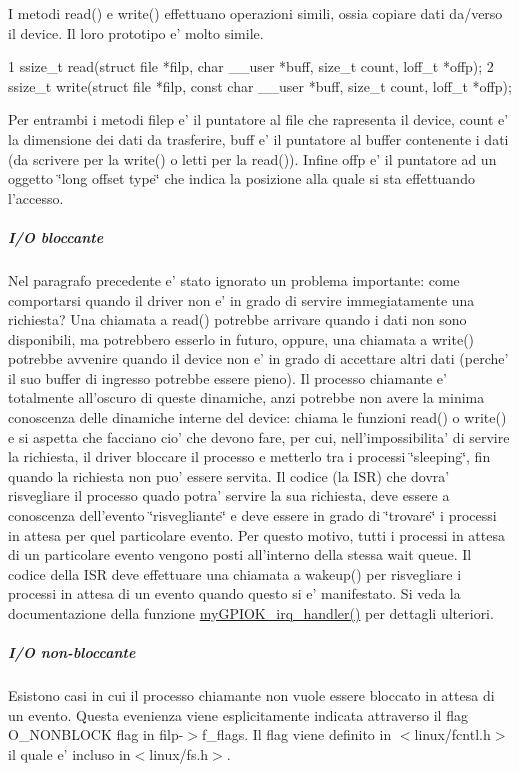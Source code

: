 I metodi read() e write() effettuano operazioni simili, ossia copiare dati da/verso il device. Il loro prototipo e' molto simile. 
\begin{DoxyCode}
1 ssize\_t read(struct file *filp, char \_\_user *buff, size\_t count, loff\_t *offp);
2 ssize\_t write(struct file *filp, const char \_\_user *buff, size\_t count, loff\_t *offp);
\end{DoxyCode}
 Per entrambi i metodi filep e' il puntatore al file che rapresenta il device, count e' la dimensione dei dati da trasferire, buff e' il puntatore al buffer contenente i dati (da scrivere per la write() o letti per la read()). Infine offp e' il puntatore ad un oggetto \char`\"{}long offset type\char`\"{} che indica la posizione alla quale si sta effettuando l'accesso.

\subparagraph*{I/\+O bloccante}

Nel paragrafo precedente e' stato ignorato un problema importante\+: come comportarsi quando il driver non e' in grado di servire immegiatamente una richiesta? Una chiamata a read() potrebbe arrivare quando i dati non sono disponibili, ma potrebbero esserlo in futuro, oppure, una chiamata a write() potrebbe avvenire quando il device non e' in grado di accettare altri dati (perche' il suo buffer di ingresso potrebbe essere pieno). Il processo chiamante e' totalmente all'oscuro di queste dinamiche, anzi potrebbe non avere la minima conoscenza delle dinamiche interne del device\+: chiama le funzioni read() o write() e si aspetta che facciano cio' che devono fare, per cui, nell'impossibilita' di servire la richiesta, il driver bloccare il processo e metterlo tra i processi \char`\"{}sleeping\char`\"{}, fin quando la richiesta non puo' essere servita. Il codice (la I\+S\+R) che dovra' risvegliare il processo quado potra' servire la sua richiesta, deve essere a conoscenza dell'evento \char`\"{}risvegliante\char`\"{} e deve essere in grado di \char`\"{}trovare\char`\"{} i processi in attesa per quel particolare evento. Per questo motivo, tutti i processi in attesa di un particolare evento vengono posti all'interno della stessa wait queue. Il codice della I\+S\+R deve effettuare una chiamata a wakeup() per risvegliare i processi in attesa di un evento quando questo si e' manifestato. Si veda la documentazione della funzione \hyperlink{group___linux-_driver_ga2fc230a12a97aa63e43b2dc4aec73511}{my\+G\+P\+I\+O\+K\+\_\+irq\+\_\+handler()} per dettagli ulteriori. \subparagraph*{I/\+O non-\/bloccante}

Esistono casi in cui il processo chiamante non vuole essere bloccato in attesa di un evento. Questa evenienza viene esplicitamente indicata attraverso il flag O\+\_\+\+N\+O\+N\+B\+L\+O\+C\+K flag in filp-\/$>$f\+\_\+flags. Il flag viene definito in $<$linux/fcntl.\+h$>$ il quale e' incluso in$<$linux/fs.\+h$>$.

